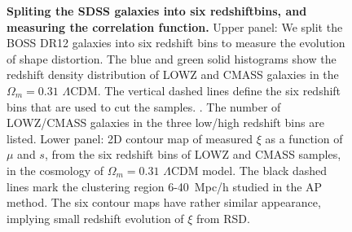 \documentclass{natureprintstyle}
\begin{document}
\begin{figure}[tb]
   \caption{\label{fig_TpCF}
   {\bf Spliting the SDSS galaxies into six redshiftbins, and measuring the correlation function.}
   Upper panel: We split the BOSS DR12 galaxies into six redshift bins to measure the evolution of shape distortion.
   The blue and green solid histograms show the redshift density distribution of LOWZ and CMASS galaxies in the $\Omega_m=0.31$ $\Lambda$CDM. 
   The vertical dashed lines define the six redshift bins that are used to cut the samples.                                       .
   The number of LOWZ/CMASS galaxies in the three low/high redshift bins are listed.
   Lower panel: 2D contour map of measured $\xi$ as a function of $\mu$ and $s$, from the six redshift bins of LOWZ and CMASS samples, 
      in the cosmology of $\Omega_m=0.31$ $\Lambda$CDM model.
    The black dashed lines mark the clustering region 6-40\ Mpc/h studied in the AP method.
    The six contour maps have rather similar appearance, implying small redshift evolution of $\xi$ from RSD.
   }
\end{figure}
\end{document}
